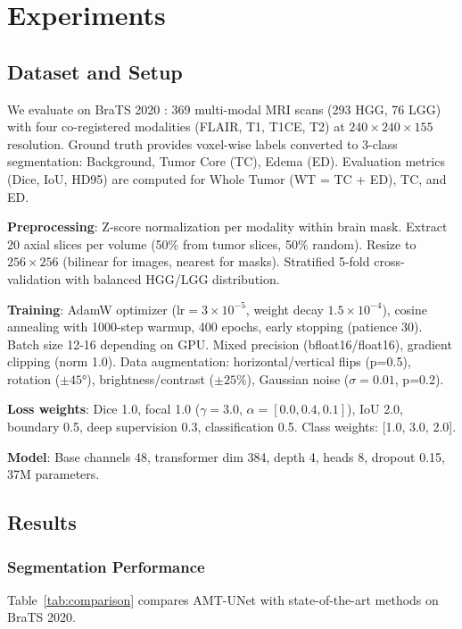 \section{Experiments}

\subsection{Dataset and Setup}

We evaluate on BraTS 2020 \cite{menze2015brats,bakas2018brats}: 369 multi-modal MRI scans (293 HGG, 76 LGG) with four co-registered modalities (FLAIR, T1, T1CE, T2) at $240 \times 240 \times 155$ resolution. Ground truth provides voxel-wise labels converted to 3-class segmentation: Background, Tumor Core (TC), Edema (ED). Evaluation metrics (Dice, IoU, HD95) are computed for Whole Tumor (WT = TC + ED), TC, and ED.

\textbf{Preprocessing}: Z-score normalization per modality within brain mask. Extract 20 axial slices per volume (50\% from tumor slices, 50\% random). Resize to $256 \times 256$ (bilinear for images, nearest for masks). Stratified 5-fold cross-validation with balanced HGG/LGG distribution.

\textbf{Training}: AdamW optimizer ($\text{lr}=3\times10^{-5}$, weight decay $1.5\times10^{-4}$), cosine annealing with 1000-step warmup, 400 epochs, early stopping (patience 30). Batch size 12-16 depending on GPU. Mixed precision (bfloat16/float16), gradient clipping (norm 1.0). Data augmentation: horizontal/vertical flips (p=0.5), rotation ($\pm45°$), brightness/contrast ($\pm25\%$), Gaussian noise ($\sigma=0.01$, p=0.2).

\textbf{Loss weights}: Dice 1.0, focal 1.0 ($\gamma=3.0$, $\alpha=[0.0, 0.4, 0.1]$), IoU 2.0, boundary 0.5, deep supervision 0.3, classification 0.5. Class weights: [1.0, 3.0, 2.0].

\textbf{Model}: Base channels 48, transformer dim 384, depth 4, heads 8, dropout 0.15, 37M parameters.

\subsection{Results}

\subsubsection{Segmentation Performance}

Table~\ref{tab:comparison} compares AMT-UNet with state-of-the-art methods on BraTS 2020.

